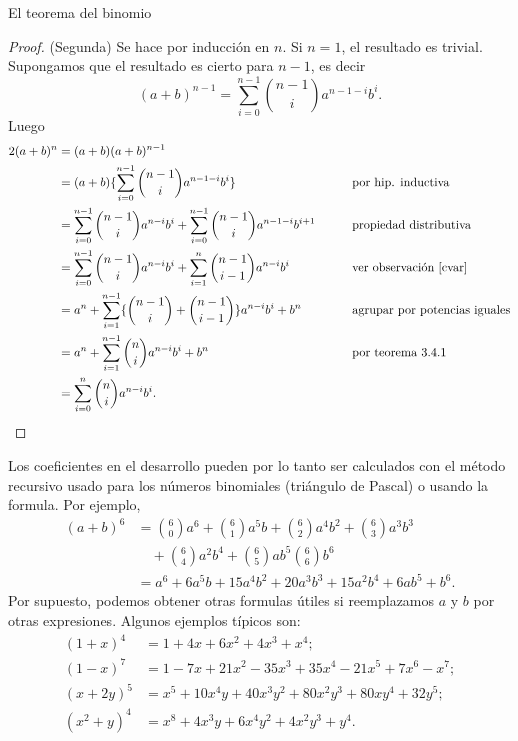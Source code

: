 \documentclass[11pt,spanish,makeidx]{amsbook}
\theoremstyle{definition}
\theoremstyle{remark}
\begin{document}
\begin{section}{El teorema del binomio}
\begin{proof}(Segunda) Se hace por inducción en $n$. Si $n=1$, el resultado es trivial. Supongamos que el resultado es cierto para $n-1$, es decir
$$
(a+b)^{n-1}=\sum_{i=0}^{n-1} \binom{n-1}{i}a ^{n-1-i}b^{i}.
$$
Luego
\begin{alignat*}2
(a+b)^n&= (a+b)(a+b)^{n-1}&& \\
& = (a+b)\{\sum_{i=0}^{n-1} \binom{n-1}{i}a ^{n-1-i}b^{i}\}&&\qquad \text{por hip. inductiva} \\
&=\sum_{i=0}^{n-1} \binom{n-1}{i}a ^{n-i}b^{i}+\sum_{i=0}^{n-1} \binom{n-1}{i}a ^{n-1-i}b^{i+1}&& \qquad \text{propiedad distributiva}\\
&=\sum_{i=0}^{n-1} \binom{n-1}{i}a ^{n-i}b^{i}+\sum_{i=1}^{n} \binom{n-1}{i-1}a ^{n-i}b^{i}&& \qquad \text{ver observación \ref{cvar}}\\
&= a^n + \sum_{i=1}^{n-1}\{ \binom{n-1}{i}+\binom{n-1}{i-1}\}a ^{n-i}b^{i}+ b^n && \qquad \text{agrupar por potencias iguales}\\
&= a^n + \sum_{i=1}^{n-1} \binom{n}{i}a ^{n-i}b^{i}+ b^n&&\qquad \text{por teorema 3.4.1} \\
&= \sum_{i=0}^{n} \binom{n}{i}a ^{n-i}b^{i}.&&\text{}
\end{alignat*}
\end{proof}

Los coeficientes en el desarrollo pueden por lo tanto ser calculados con el método recursivo usado para los números binomiales (triángulo de Pascal) o usando la formula. Por ejemplo,
$$
\begin{aligned} (a+b)^6 &= \binom{6}{0} a^6 + \binom{6}{1} a^5 b
+\binom{6}{2}a^4b^2 +
\binom{6}{3}a^3b^3 \\
&\quad + \binom{6}{4}a^2b^4+\binom{6}{5}ab^5\binom{6}{6}b^6 \\
&=  a^6 + 6 a^5 b +15a^4b^2 + 20a^3b^3 + 15a^2b^4+6ab^5+ b^6.
\end{aligned}
$$
Por supuesto, podemos obtener otras formulas útiles si reemplazamos $a$ y $b$ por otras expresiones. Algunos ejemplos típicos son:
$$\begin{aligned}
(1+x)^4 &= 1 + 4x + 6x^2+ 4x^3+ x^4;\\
(1-x)^7 &= 1 -7x + 21x^2- 35x^3+ 35x^4- 21x^5+ 7x^6 -x^7;\\
(x+2y)^5 &= x^5 + 10 x^4 y + 40 x^3 y^2+80 x^2 y^3+80 x y^4+32 y^5; \\
(x^2+y)^4 &= x^8 +4 x^3 y +6 x^4 y^2 +4 x^2 y^3 + y^4.
\end{aligned}
$$


\end{section}
\end{document}
